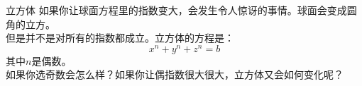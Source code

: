 ﻿\begin{surferPage}{立方体}
如果你让球面方程里的指数变大，会发生令人惊讶的事情。球面会变成圆角的立方。\\
\vspace{0.3cm}
但是并不是对所有的指数都成立。立方体的方程是：
\[x^n+y^n+z^n=b\]
其中$n$是偶数。\\
\vspace{0.3cm}
如果你选奇数会怎么样？如果你让偶指数很大很大，立方体又会如何变化呢？
\end{surferPage}
